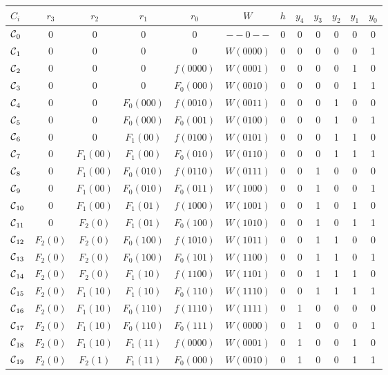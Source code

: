 \begin{table*}
\begin{center}
\begin{tabular}{|l | c c c c c c c c c c c |}
$C_i$ &$r_3$ & $r_2$ & $r_1$ & $r_0$ & $W$ & $h$ & $y_4$ & $y_3$ & $y_2$ & $y_1$ & $y_0$ \\ \hline
$\mbox{$\mathcal{C}$}_0$ & 0 & 0 & 0 & 0 & $--0--$ & 0 & 0 & 0 & 0 & 0 & 0 \\ 
$\mbox{$\mathcal{C}$}_1$ & 0 & 0 & 0 & 0 & $W(0000)$ & 0 & 0 & 0 & 0 & 0 & 1 \\ 
$\mbox{$\mathcal{C}$}_2$ & 0 & 0 & 0 & $f(0000)$ & $W(0001)$ & 0 & 0 & 0 & 0 & 1 & 0 \\ 
$\mbox{$\mathcal{C}$}_3$ & 0 & 0 & 0 & $F_0(000)$ & $W(0010)$ & 0 & 0 & 0 & 0 & 1 & 1 \\ 
$\mbox{$\mathcal{C}$}_4$ & 0 & 0 & $F_0(000)$ & $f(0010)$ & $W(0011)$ & 0 & 0 & 0 & 1 & 0 & 0 \\ 
$\mbox{$\mathcal{C}$}_5$ & 0 & 0 & $F_0(000)$ & $F_0(001)$ & $W(0100)$ & 0 & 0 & 0 & 1 & 0 & 1 \\ 
$\mbox{$\mathcal{C}$}_6$ & 0 & 0 & $F_1(00)$ & $f(0100)$ & $W(0101)$ & 0 & 0 & 0 & 1 & 1 & 0 \\ 
$\mbox{$\mathcal{C}$}_7$ & 0 & $F_1(00)$ &$F_1(00)$ & $F_0(010)$ & $W(0110)$ & 0 & 0 & 0 & 1 & 1 & 1 \\ 
$\mbox{$\mathcal{C}$}_8$ & 0 & $F_1(00)$ & $F_0(010)$ & $f(0110)$ & $W(0111)$ & 0 & 0 & 1 & 0 & 0 & 0 \\ 
$\mbox{$\mathcal{C}$}_9$ & 0 & $F_1(00)$ & $F_0(010)$ & $F_0(011)$ & $W(1000)$ & 0 & 0 & 1 & 0 & 0 & 1 \\ 
$\mbox{$\mathcal{C}$}_{10}$ & 0 & $F_1(00)$ & $F_1(01)$ & $f(1000)$ & $W(1001)$ & 0 & 0 & 1 & 0 & 1 & 0 \\ 
$\mbox{$\mathcal{C}$}_{11}$ & 0 & $F_2(0)$ & $F_1(01)$ & $F_0(100)$ & $W(1010)$ & 0 & 0 & 1 & 0 & 1 & 1 \\ 
$\mbox{$\mathcal{C}$}_{12}$ & $F_2(0)$& $F_2(0)$ & $F_0(100)$ & $f(1010)$ & $W(1011)$ & 0 & 0 & 1 & 1 & 0 & 0 \\ 
$\mbox{$\mathcal{C}$}_{13}$ & $F_2(0)$& $F_2(0)$ & $F_0(100)$ & $F_0(101)$ & $W(1100)$ & 0 & 0 & 1 & 1 & 0 & 1 \\ 
$\mbox{$\mathcal{C}$}_{14}$ & $F_2(0)$ & $F_2(0)$ & $F_1(10)$ & $f(1100)$ & $W(1101)$ & 0 & 0 & 1 & 1 & 1 & 0 \\ 
$\mbox{$\mathcal{C}$}_{15}$ & $F_2(0)$ & $F_1(10)$ & $F_1(10)$ & $F_0(110)$ & $W(1110)$ & 0 & 0 & 1 & 1 & 1 & 1 \\ 
$\mbox{$\mathcal{C}$}_{16}$ & $F_2(0)$ & $F_1(10)$ & $F_0(110)$ & $f(1110)$ & $W(1111)$ & 0 & 1 & 0 & 0 & 0 & 0 \\ 
$\mbox{$\mathcal{C}$}_{17}$ & $F_2(0)$ & $F_1(10)$ & $F_0(110)$ & $F_0(111)$ & $W(0000)$ & 0 & 1 & 0 & 0 & 0 & 1 \\ 
$\mbox{$\mathcal{C}$}_{18}$ & $F_2(0)$ & $F_1(10)$ & $F_1(11)$ & $f(0000)$ & $W(0001)$ & 0 & 1 & 0 & 0 & 1 & 0 \\ 
$\mbox{$\mathcal{C}$}_{19}$ & $F_2(0)$ & $F_2(1)$ & $F_1(11)$ & $F_0(000)$ & $W(0010)$ & 0 & 1 & 0 & 0 & 1 & 1 \\ 

\end{tabular}
\end{center}
\end{table*}
